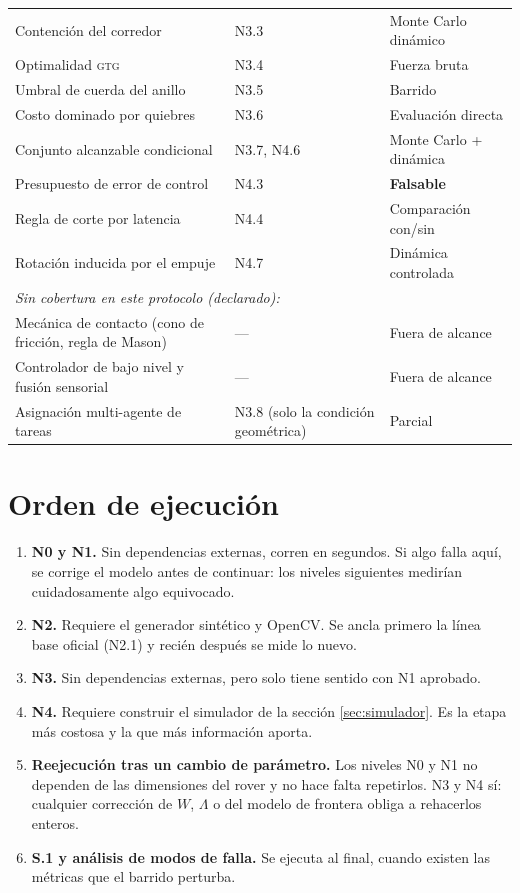 \documentclass[11pt,a4paper]{article}
\begin{document}
\begin{table}[htbp]
\begin{tabular}{p{6.6cm}p{3.3cm}p{4.2cm}}
Contención del corredor & N3.3 & Monte Carlo dinámico \\
Optimalidad \textsc{gtg} & N3.4 & Fuerza bruta \\
Umbral de cuerda del anillo & N3.5 & Barrido \\
Costo dominado por quiebres & N3.6 & Evaluación directa \\
Conjunto alcanzable condicional & N3.7, N4.6 & Monte Carlo + dinámica \\
Presupuesto de error de control & N4.3 & \textbf{Falsable} \\
Regla de corte por latencia & N4.4 & Comparación con/sin \\
Rotación inducida por el empuje & N4.7 & Dinámica controlada \\
\midrule
\multicolumn{3}{l}{\textit{Sin cobertura en este protocolo (declarado):}}\\
Mecánica de contacto (cono de fricción, regla de Mason) & --- & Fuera de alcance \\
Controlador de bajo nivel y fusión sensorial & --- & Fuera de alcance \\
Asignación multi-agente de tareas & N3.8 (solo la condición geométrica) & Parcial \\
\bottomrule
\end{tabular}
\label{tab:trazabilidad}
\end{table}

\section{Orden de ejecución}

\begin{enumerate}[label=\textbf{Etapa \arabic*.},leftmargin=3.4em,itemsep=4pt]
\item \textbf{N0 y N1.} Sin dependencias externas, corren en segundos. Si algo falla
      aquí, se corrige el modelo antes de continuar: los niveles siguientes medirían
      cuidadosamente algo equivocado.
\item \textbf{N2.} Requiere el generador sintético y OpenCV. Se ancla primero la línea
      base oficial (N2.1) y recién después se mide lo nuevo.
\item \textbf{N3.} Sin dependencias externas, pero solo tiene sentido con N1 aprobado.
\item \textbf{N4.} Requiere construir el simulador de la sección \ref{sec:simulador}.
      Es la etapa más costosa y la que más información aporta.
\item \textbf{Reejecución tras un cambio de parámetro.} Los niveles N0 y N1 no dependen
      de las dimensiones del rover y no hace falta repetirlos. N3 y N4 sí: cualquier
      corrección de $W$, $\Lambda$ o del modelo de frontera obliga a rehacerlos enteros.
\item \textbf{S.1 y análisis de modos de falla.} Se ejecuta al final, cuando existen las
      métricas que el barrido perturba.
\end{enumerate}
\end{document}

